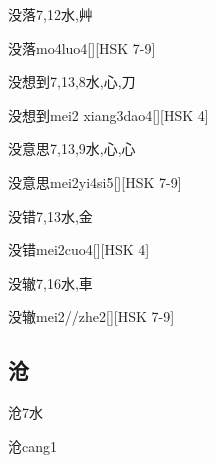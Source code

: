 \begin{Entry}{没落}{7,12}{⽔,⾋}
  \begin{Phonetics}{没落}{mo4luo4}[][HSK 7-9]
  \end{Phonetics}
\end{Entry}

\begin{Entry}{没想到}{7,13,8}{⽔,⼼,⼑}
  \begin{Phonetics}{没想到}{mei2 xiang3dao4}[][HSK 4]
  \end{Phonetics}
\end{Entry}

\begin{Entry}{没意思}{7,13,9}{⽔,⼼,⼼}
  \begin{Phonetics}{没意思}{mei2yi4si5}[][HSK 7-9]
  \end{Phonetics}
\end{Entry}

\begin{Entry}{没错}{7,13}{⽔,⾦}
  \begin{Phonetics}{没错}{mei2cuo4}[][HSK 4]
  \end{Phonetics}
\end{Entry}

\begin{Entry}{没辙}{7,16}{⽔,⾞}
  \begin{Phonetics}{没辙}{mei2//zhe2}[][HSK 7-9]
  \end{Phonetics}
\end{Entry}

\subsection*{沧}

\begin{Entry}{沧}{7}{⽔}
  \begin{Phonetics}{沧}{cang1}
  \end{Phonetics}
\end{Entry}

